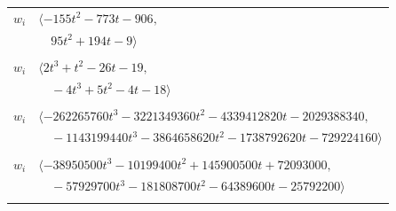 \documentclass[11pt]{article}
\begin{document}
\begin{longtable}{@{}ll@{}}
$w_i$ & $\langle -155t^{2}-773t-906,$\\
 & $\quad 95t^{2}+194t-9\rangle$\\
\addlinespace[2pt]
\multicolumn{2}{@{}p{0.97\textwidth}@{}}{$i=38$, $D_i=1$, $\rho_{ij}$: $2{:}2, \allowbreak 8{:}1, \allowbreak 16{:}1, \allowbreak 18{:}2, \allowbreak 26{:}2, \allowbreak 29{:}1, \allowbreak 33{:}1, \allowbreak 40{:}2, \allowbreak 61{:}1$}\\
$w_i$ & $\langle 2t^{3}+t^{2}-26t-19,$\\
 & $\quad -4t^{3}+5t^{2}-4t-18\rangle$\\
\addlinespace[2pt]
\multicolumn{2}{@{}p{0.97\textwidth}@{}}{$i=39$, $D_i=1$, $\rho_{ij}$: $0{:}1, \allowbreak 1{:}2, \allowbreak 2{:}2, \allowbreak 4{:}2, \allowbreak 11{:}1, \allowbreak 17{:}2, \allowbreak 18{:}1, \allowbreak 21{:}2, \allowbreak 22{:}2, \allowbreak 25{:}2, \allowbreak 27{:}1, \allowbreak 30{:}2, \allowbreak 40{:}2, \allowbreak 41{:}1, \allowbreak 45{:}2, \allowbreak 47{:}2, \allowbreak 57{:}2, \allowbreak 61{:}1, \allowbreak 68{:}2, \allowbreak 70{:}1, \allowbreak 71{:}2, \allowbreak 77{:}2, \allowbreak 79{:}1, \allowbreak 84{:}2, \allowbreak 95{:}1$}\\
$w_i$ & $\langle -262265760t^{3}-3221349360t^{2}-4339412820t-2029388340,$\\
 & $\quad -1143199440t^{3}-3864658620t^{2}-1738792620t-729224160\rangle$\\
\addlinespace[2pt]
\multicolumn{2}{@{}p{0.97\textwidth}@{}}{$i=40$, $D_i=1$, $\rho_{ij}$: $0{:}2, \allowbreak 1{:}1, \allowbreak 2{:}1, \allowbreak 4{:}1, \allowbreak 9{:}1, \allowbreak 12{:}2, \allowbreak 13{:}1, \allowbreak 16{:}1, \allowbreak 19{:}2, \allowbreak 23{:}1, \allowbreak 25{:}2, \allowbreak 26{:}2, \allowbreak 31{:}1, \allowbreak 38{:}1, \allowbreak 39{:}1, \allowbreak 42{:}2, \allowbreak 59{:}2, \allowbreak 60{:}2, \allowbreak 63{:}2, \allowbreak 75{:}1, \allowbreak 76{:}1, \allowbreak 79{:}1, \allowbreak 87{:}1, \allowbreak 89{:}1, \allowbreak 93{:}1$}\\
$w_i$ & $\langle -38950500t^{3}-10199400t^{2}+145900500t+72093000,$\\
 & $\quad -57929700t^{3}-181808700t^{2}-64389600t-25792200\rangle$\\
\addlinespace[2pt]
\multicolumn{2}{@{}p{0.97\textwidth}@{}}{$i=41$, $D_i=1$, $\rho_{ij}$: $0{:}2, \allowbreak 5{:}2, \allowbreak 10{:}1, \allowbreak 15{:}2, \allowbreak 16{:}2, \allowbreak 18{:}1, \allowbreak 21{:}1, \allowbreak 22{:}2, \allowbreak 25{:}1, \allowbreak 33{:}1, \allowbreak 39{:}2, \allowbreak 42{:}1, \allowbreak 45{:}1, \allowbreak 55{:}1, \allowbreak 64{:}2, \allowbreak 67{:}1, \allowbreak 70{:}1, \allowbreak 73{:}1, \allowbreak 75{:}1$}\\

\end{longtable}
\end{document}
